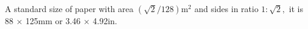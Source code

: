 A standard size of paper with area $ ( \sqrt{2} / 128 ) \mathrm{m}^2 $ and sides in ratio
$ 1 : \sqrt{2} , $ it is 88 \ensuremath{ \times } 125mm or 3.46 \ensuremath{ \times } 4.92in.